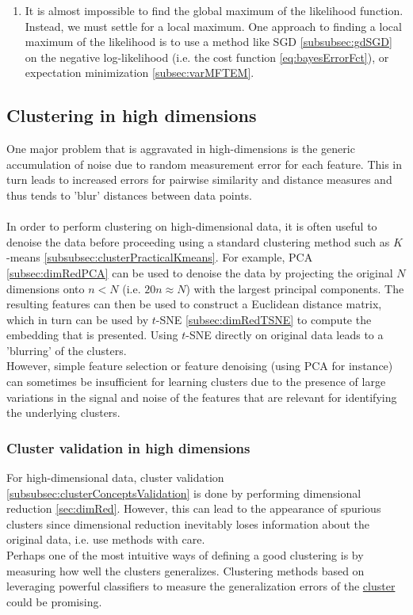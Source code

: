 \begin{enumerate}
\item It is almost impossible to find the global maximum of the likelihood function. Instead, we must settle for a local maximum. One approach to finding a local maximum of the likelihood is to use a method like SGD \ref{subsubsec:gdSGD} on the negative log-likelihood (i.e. the cost function \ref{eq:bayesErrorFct}), or expectation minimization \ref{subsec:varMFTEM}.
\end{enumerate}


\subsection{Clustering in high dimensions}
\label{subsec:clusterHighD}
One major problem that is aggravated in high-dimensions is the generic accumulation of noise due to random measurement error for each feature. This in turn leads to increased errors for pairwise similarity and distance measures and thus tends to ’blur’ distances between data points.\\
\\
In order to perform clustering on high-dimensional data, it is often useful to denoise the data before proceeding using a standard clustering method such as $K$-means \ref{subsubsec:clusterPracticalKmeans}. 
For example, PCA \ref{subsec:dimRedPCA} can be used to denoise the data by projecting the original $N$ dimensions onto $n < N$ (i.e. $20n\approx N$) with the largest principal components. The resulting features can then be used to construct a Euclidean distance matrix, which in turn can be used by $t$-SNE \ref{subsec:dimRedTSNE} to compute the embedding that is presented. Using $t$-SNE directly on original data leads to a ’blurring’ of the clusters.\\
However, simple feature selection or feature denoising (using PCA for instance) can sometimes be insufficient for learning clusters due to the presence of large variations in the signal and noise of the features that are relevant for identifying the underlying clusters.

\subsubsection{Cluster validation in high dimensions}
For high-dimensional data, cluster validation \ref{subsubsec:clusterConceptsValidation} is done by performing dimensional reduction \ref{sec:dimRed}. However, this can lead to the appearance of spurious clusters since dimensional reduction inevitably loses information about the original data, i.e. use methods with care.\\
Perhaps one of the most intuitive ways of defining a good clustering is by measuring how well the clusters generalizes. Clustering methods based on leveraging powerful classifiers to measure the generalization errors of the \href{https://pypi.org/project/hal-x/}{cluster} could be promising.


